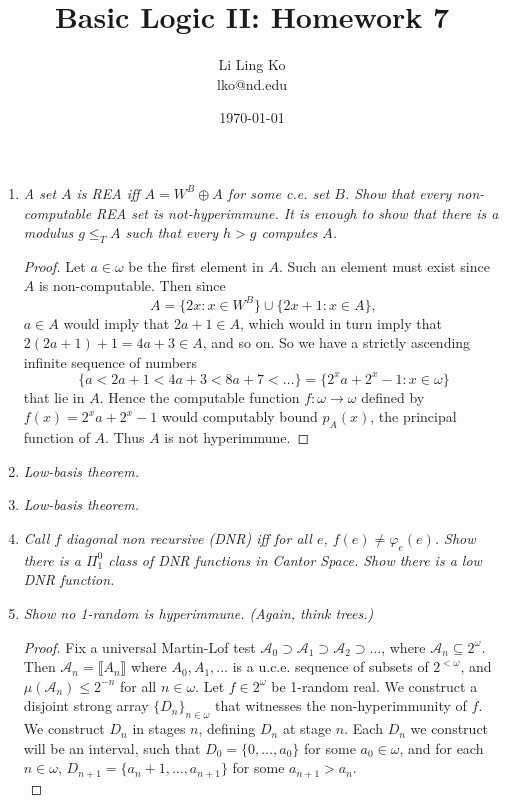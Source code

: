 \documentclass{article}
\begin{document}
\title{Basic Logic II: Homework 7}
\author{Li Ling Ko\\ lko@nd.edu}
\date{\today}
\maketitle

\begin{enumerate}
  \item \it A set $A$ is REA iff $A=W^B\oplus A$ for some c.e. set $B$.
    Show that every non-computable REA set is not-hyperimmune. It is enough
    to show that there is a modulus $g\leq_TA$ such that every $h>g$
    computes $A$.

    \begin{proof}
      Let $a\in\omega$ be the first element in $A$. Such an
      element must exist since $A$ is non-computable. Then since
      \[A =\{2x:x\in W^B\} \cup \{2x+1:x\in A\},\]
      $a\in A$ would imply that $2a+1\in A$, which would in turn imply that
      $2(2a+1)+1=4a+3\in A$, and so on. So we have a strictly ascending
      infinite sequence of numbers
      \[\{a <2a+1 <4a+3 <8a+7 <\ldots\} =\{2^xa+2^x-1: x\in\omega\}\]
      that lie in $A$. Hence the computable function
      $f:\omega\rightarrow\omega$ defined by $f(x)=2^xa+2^x-1$ would
      computably bound $p_A(x)$, the principal function of $A$. Thus $A$
      is not hyperimmune.
    \end{proof}

  \item \it Low-basis theorem.
  \item \it Low-basis theorem.

  \item \it Call $f$ diagonal non recursive (DNR) iff for all $e$,
    $f(e)\neq\varphi_e(e)$. Show there is a $\Pi^0_1$ class of DNR
    functions in Cantor Space. Show there is a low DNR function.

  \item \it Show no 1-random is hyperimmune. (Again, think trees.)
    \begin{proof}
      Fix a universal Martin-Lof test
      $\mathcal{A}_0\supset\mathcal{A}_1\supset\mathcal{A}_2\supset\ldots$,
      where $\mathcal{A}_n\subseteq2^\omega$. Then $\mathcal{A}_n
      =\llbracket A_n\rrbracket$ where $A_0,A_1,\ldots$ is a u.c.e.
      sequence of subsets of $2^{<\omega}$, and
      $\mu(\mathcal{A}_n)\leq2^{-n}$ for all $n\in\omega$. Let
      $f\in2^\omega$ be 1-random real. We construct a disjoint strong array
      $\{D_n\}_{n\in\omega}$ that witnesses the non-hyperimmunity of $f$.
      We construct $D_n$ in stages $n$, defining $D_n$ at stage $n$. Each
      $D_n$ we construct will be an interval, such that
      $D_0=\{0,\ldots,a_0\}$ for some $a_0\in\omega$, and for each
      $n\in\omega$, $D_{n+1}=\{a_n+1,\ldots,a_{n+1}\}$ for some
      $a_{n+1}>a_n$. \\


\end{proof}
\end{enumerate}
\end{document}
